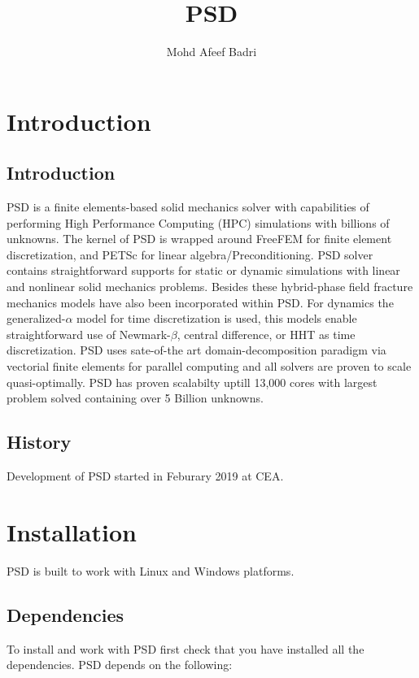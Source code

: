 \documentclass{report}
\title{PSD}
\author{Mohd Afeef Badri}
\begin{document}
\maketitle

\pagebreak
\tableofcontents
\pagebreak
\chapter{Introduction} 

\section{Introduction} 
PSD is a finite elements-based solid mechanics solver with capabilities of performing High Performance Computing (HPC) simulations with billions of unknowns. The kernel of PSD is wrapped around FreeFEM for finite element discretization, and PETSc for linear algebra/Preconditioning. PSD solver contains straightforward supports for static or dynamic simulations with linear  and nonlinear solid mechanics problems. Besides these hybrid-phase field fracture mechanics models have also been incorporated within PSD. For dynamics the generalized-$\alpha$ model  for time discretization is used, this models enable straightforward use of Newmark-$\beta$, central difference, or HHT as time discretization. PSD uses sate-of-the art domain-decomposition paradigm via vectorial finite elements for parallel computing and all solvers are  proven to scale quasi-optimally. PSD has proven scalabilty uptill 13,000 cores with largest problem solved containing over 5 Billion unknowns.

\section{History}
Development of PSD started in Feburary 2019 at CEA.  

\chapter{Installation}


PSD is built to work with Linux and Windows platforms. 

\section{Dependencies}

To install and work with PSD first check that you have installed all the dependencies. PSD depends on the following:   
\end{document}
